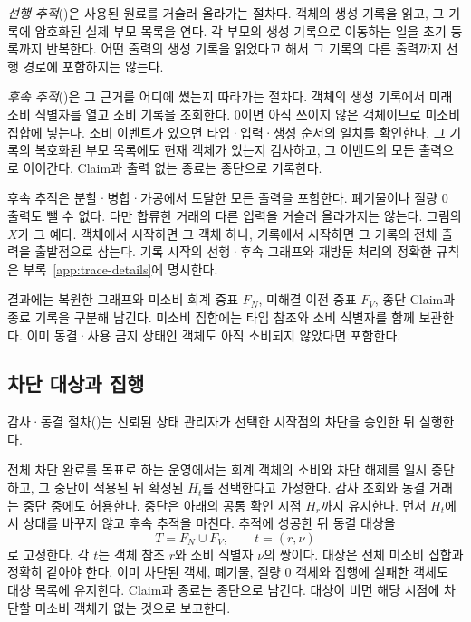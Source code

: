 \emph{선행 추적}()은 사용된 원료를 거슬러 올라가는 절차다.
객체의 생성 기록을 읽고, 그 기록에 암호화된 실제 부모 목록을 연다.
각 부모의 생성 기록으로 이동하는 일을 초기 등록까지 반복한다.
어떤 출력의 생성 기록을 읽었다고 해서 그 기록의 다른 출력까지
선행 경로에 포함하지는 않는다.

\emph{후속 추적}()은 그 근거를 어디에 썼는지 따라가는 절차다.
객체의 생성 기록에서 미래 소비 식별자를 열고 소비 기록을 조회한다.
0이면 아직 쓰이지 않은 객체이므로 미소비 집합에 넣는다.
소비 이벤트가 있으면 타입·입력·생성 순서의 일치를 확인한다.
그 기록의 복호화된 부모 목록에도 현재 객체가 있는지 검사하고,
그 이벤트의 모든 출력으로 이어간다.
Claim과 출력 없는 종료는 종단으로 기록한다.

후속 추적은 분할·병합·가공에서 도달한 모든 출력을 포함한다.
폐기물이나 질량 0 출력도 뺄 수 없다.
다만 합류한 거래의 다른 입력을 거슬러 올라가지는 않는다.
그림의 $X$가 그 예다. 객체에서 시작하면 그 객체 하나,
기록에서 시작하면 그 기록의 전체 출력을 출발점으로 삼는다.
기록 시작의 선행·후속 그래프와 재방문 처리의 정확한 규칙은
부록~\ref{app:trace-details}에 명시한다.

결과에는 복원한 그래프와 미소비 회계 증표 $F_N$,
미해결 이전 증표 $F_V$, 종단 Claim과 종료 기록을 구분해 남긴다.
미소비 집합에는 타입 참조와 소비 식별자를 함께 보관한다.
이미 동결·사용 금지 상태인 객체도 아직 소비되지 않았다면 포함한다.

\subsection{차단 대상과 집행}

감사·동결 절차()는 신뢰된 상태 관리자가
선택한 시작점의 차단을 승인한 뒤 실행한다.

전체 차단 완료를 목표로 하는 운영에서는 회계 객체의 소비와 차단
해제를 일시 중단하고, 그 중단이 적용된 뒤 확정된 $H_t$를 선택한다고
가정한다. 감사 조회와 동결 거래는 중단 중에도 허용한다.
중단은 아래의 공통 확인 시점 $H_r$까지 유지한다.
먼저 $H_t$에서 상태를 바꾸지 않고 후속 추적을 마친다.
추적에 성공한 뒤 동결 대상을
\begin{equation}
 T=F_N\cup F_V,\qquad t=(r,\nu)
 \label{eq:targets}
\end{equation}
로 고정한다. 각 $t$는 객체 참조 $r$와 소비 식별자 $\nu$의 쌍이다.
대상은 전체 미소비 집합과 정확히 같아야 한다.
이미 차단된 객체, 폐기물, 질량 0 객체와 집행에 실패한 객체도
대상 목록에 유지한다. Claim과 종료는 종단으로 남긴다.
대상이 비면 해당 시점에 차단할 미소비 객체가 없는 것으로 보고한다.

